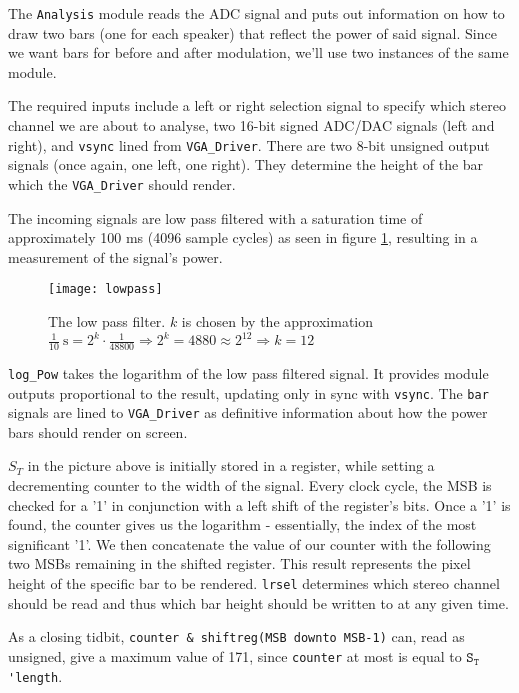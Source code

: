 The \verb=Analysis= module reads the ADC signal and puts out information on how to draw two bars (one for each speaker) that reflect the power of said signal. Since we want bars for before and after modulation, we'll use two instances of the same module. 

The required inputs include a left or right selection signal to specify which stereo channel we are about to analyse, two 16-bit signed ADC/DAC signals (left and right), and \verb=vsync= lined from \verb+VGA_Driver+. There are two 8-bit unsigned output signals (once again, one left, one right). They determine the height of the bar which the \verb=VGA_Driver= should render.

The incoming signals are low pass filtered with a saturation time of approximately 100 ms (4096 sample cycles) as seen in figure \ref{fig:lowpass}, resulting in a measurement of the signal's power. 

\begin{figure}[h]
\centering
\texttt{[image: lowpass]}
\caption{The low pass filter. $k$ is chosen by the approximation $\frac{1}{10}\mathrm{\ s} = 2^k\cdot\frac{1}{48800}\Rightarrow 2^k=4880\approx 2^{12}\Rightarrow k = 12 $}
\label{fig:lowpass}
\end{figure}

\verb=log_Pow= takes the logarithm of the low pass filtered signal. It provides module outputs proportional to the result, updating only in sync with \verb+vsync+. The \verb+bar+ signals are lined to \verb+VGA_Driver+ as definitive information about how the power bars should render on screen.

$S_T$ in the picture above is initially stored in a register, while setting a decrementing counter to the width of the signal. Every clock cycle, the MSB is checked for a '1' in conjunction with a left shift of the register's bits. Once a '1' is found, the counter gives us the logarithm - essentially, the index of the most significant '1'. We then concatenate the value of our counter with the following two MSBs remaining in the shifted register. This result represents the pixel height of the specific bar to be rendered. \verb=lrsel= determines which stereo channel should be read and thus which bar height should be written to at any given time.

As a closing tidbit, \verb=counter & shiftreg(MSB downto MSB-1)= can, read as unsigned, give a maximum value of 171, since \verb=counter= at most is equal to $\mathtt{S_T}$\verb='length=.
